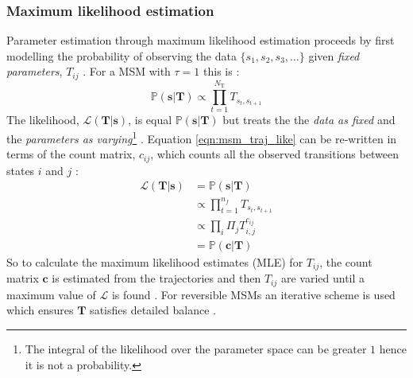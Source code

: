\subsubsection{Maximum likelihood estimation}
Parameter estimation through maximum likelihood estimation proceeds by first modelling  the probability of observing the data $\{s_{1}, s_{2}, s_{3}, \ldots \}$ given \emph{fixed parameters}, $T_{ij}$ \cite{wasserman2013all}. For a MSM  with  $\tau=1$ this is \cite{trendelkamp-schroerEstimationUncertaintyReversible2015b}:
\begin{equation}\label{eqn:msm_traj_like}
    \mathbb{P}(\mathbf{s}|\mathbf{T}) \propto \prod_{t=1}^{N_{\mathrm{T}}} T_{s_{t}, s_{t+1}}
\end{equation}
The likelihood, $\mathcal{L}(\mathbf{T}|\mathbf{s})$, is equal $\mathbb{P}(\mathbf{s}|\mathbf{T})$ but treats the the \emph{data as fixed} and the \emph{parameters as varying}\footnote{The integral of the likelihood over the parameter space can be greater $1$ hence it is not a probability.} \cite{wasserman2013all}. Equation \ref{eqn:msm_traj_like} can be re-written in terms of the count matrix, $c_{ij}$, which counts all the observed transitions between states $i$ and $j$ \cite{trendelkamp-schroerEstimationUncertaintyReversible2015b}:
\begin{align}
    \mathcal{L}(\mathbf{T}|\mathbf{s}) & = \mathbb{P}(\mathbf{s}|\mathbf{T}) \\
    & \propto \prod_{t=1}^{n_{f}} T_{s_{t}, s_{t+1}} \\ 
    & \propto \prod_{i}\Pi_{j}T_{i, j}^{c_{ij}} \\
    & = \mathbb{P}(\mathbf{c}|\mathbf{T}) \label{eqn:msm_count_like}
\end{align}
So to calculate the maximum likelihood estimates (MLE) for $T_{ij}$, the count matrix $\mathbf{c}$ is estimated from the trajectories and then $T_{ij}$ are varied until a maximum value of $\mathcal{L}$ is found \cite{wasserman2013all}. For reversible MSMs an iterative scheme is used which ensures $\mathbf{T}$ satisfies detailed balance \cite{trendelkamp-schroerEstimationUncertaintyReversible2015b}. 




